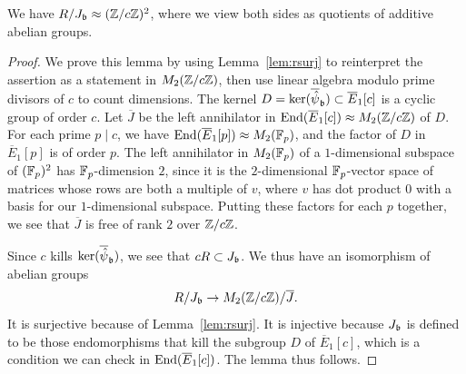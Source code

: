 \documentclass{article} \usepackage[active]{srcltx}
\begin{document}
\begin{lemma}\label{lem:jb}
We have
   $R/J_{\mathfrak{b}}\approx (\mathbb{Z}/c\mathbb{Z})^2$,
where we view both sides as quotients of additive abelian groups.
\end{lemma}
\begin{proof}
We prove this lemma by using Lemma~\ref{lem:rsurj} to 
reinterpret the assertion as a statement in $M_2(\mathbb{Z}/c\mathbb{Z})$, then use 
linear algebra modulo prime divisors of $c$ to count dimensions. 
The kernel $D =
  \ker(\overline{\hat{\psi}}_{\mathfrak{b}}) \subset \overline{E}_1[c]$ is a
  cyclic group of order $c$.  Let $\overline{J}$ be the left
  annihilator in $\operatorname{End}(\overline{E}_1[c])\approx M_2(\mathbb{Z}/c\mathbb{Z})$ of $D$.
  For each prime $p\mid c$, we have $\operatorname{End}(\overline{E}_1[p]) \approx
  M_2(\mathbb{F}_p)$, and the factor of $D$ in $\overline{E}_1[p]$ is of order
  $p$.  The left annihilator in $M_2(\mathbb{F}_p)$ of a $1$-dimensional
  subspace of $(\mathbb{F}_p)^2$ has $\mathbb{F}_p$-dimension $2$, since it is the
  $2$-dimensional $\mathbb{F}_p$-vector space of matrices whose rows are both
  a multiple of $v$, where $v$ has dot product $0$ with a basis for
  our $1$-dimensional subspace.  Putting these factors for each $p$
  together, we see that $\overline{J}$ is free of rank
  $2$ over $\mathbb{Z}/c\mathbb{Z}$.

  Since $c$ kills $\ker(\overline{\hat{\psi}}_{\mathfrak{b}})$, we see that
  $cR\subset J_{\mathfrak{b}}$.  We thus have an isomorphism of abelian groups
  $$
   R/ J_{\mathfrak{b}} \to M_2(\mathbb{Z}/c\mathbb{Z})/\overline{J}.
  $$
  It is surjective because of Lemma~\ref{lem:rsurj}.  It is injective
  because $J_{\mathfrak{b}}$ is defined to be those endomorphisms that kill the
subgroup $D$ of  $\overline{E}_1[c]$, which is a condition we can check in
  $\operatorname{End}(\overline{E}_1[c])$.  The lemma thus follows.
\end{proof}
\end{document}
